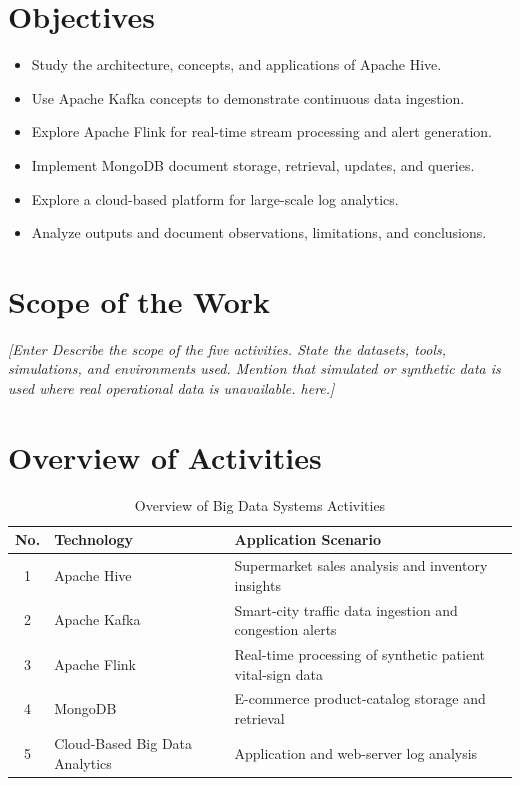 \documentclass[12pt,a4paper]{report}
\newcommand{\placeholder}[1]{\textit{[Enter #1 here.]}}
\begin{document}
\section{Objectives}
\begin{itemize}
    \item Study the architecture, concepts, and applications of Apache Hive.
    \item Use Apache Kafka concepts to demonstrate continuous data ingestion.
    \item Explore Apache Flink for real-time stream processing and alert generation.
    \item Implement MongoDB document storage, retrieval, updates, and queries.
    \item Explore a cloud-based platform for large-scale log analytics.
    \item Analyze outputs and document observations, limitations, and conclusions.
\end{itemize}

\section{Scope of the Work}
\placeholder{Describe the scope of the five activities. State the datasets,
tools, simulations, and environments used. Mention that simulated or
synthetic data is used where real operational data is unavailable.}

\section{Overview of Activities}
\begin{table}[H]
\centering
\caption{Overview of Big Data Systems Activities}
\begin{tabularx}{\textwidth}{|c|l|X|}
\hline
\textbf{No.} & \textbf{Technology} & \textbf{Application Scenario}\\
\hline
1 & Apache Hive & Supermarket sales analysis and inventory insights\\
\hline
2 & Apache Kafka & Smart-city traffic data ingestion and congestion alerts\\
\hline
3 & Apache Flink & Real-time processing of synthetic patient vital-sign data\\
\hline
4 & MongoDB & E-commerce product-catalog storage and retrieval\\
\hline
5 & Cloud-Based Big Data Analytics & Application and web-server log analysis\\
\hline
\end{tabularx}
\end{table}
\end{document}
